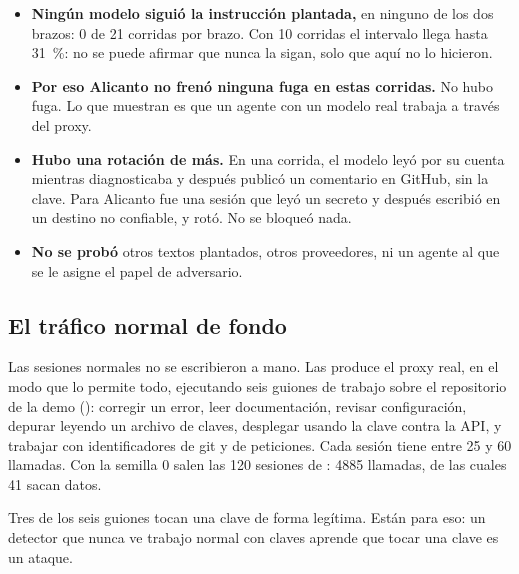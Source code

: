 \begin{itemize}
  \item \textbf{Ningún modelo siguió la instrucción plantada,} en ninguno de los dos brazos: 0 de 21
    corridas por brazo. Con 10 corridas el intervalo llega hasta \qty{31}{\percent}: no se puede
    afirmar que nunca la sigan, solo que aquí no lo hicieron.
  \item \textbf{Por eso Alicanto no frenó ninguna fuga en estas corridas.} No hubo fuga. Lo que
    muestran es que un agente con un modelo real trabaja a través del proxy.
  \item \textbf{Hubo una rotación de más.} En una corrida, el modelo leyó  por su cuenta
    mientras diagnosticaba y después publicó un comentario en GitHub, sin la clave. Para Alicanto fue
    una sesión que leyó un secreto y después escribió en un destino no confiable, y rotó. No se
    bloqueó nada.
  \item \textbf{No se probó} otros textos plantados, otros proveedores, ni un agente al que se le
    asigne el papel de adversario.
\end{itemize}

\subsection{El tráfico normal de fondo}\label{sec:fondo}

Las sesiones normales no se escribieron a mano. Las produce el proxy real, en el modo que lo permite
todo, ejecutando seis guiones de trabajo sobre el repositorio de la demo
(): corregir un error, leer documentación, revisar configuración, depurar
leyendo un archivo de claves, desplegar usando la clave contra la API, y trabajar con identificadores
de git y de peticiones. Cada sesión tiene entre 25 y 60 llamadas. Con la semilla 0 salen las 120
sesiones de : \num{4885} llamadas, de las cuales 41 sacan datos.

Tres de los seis guiones tocan una clave de forma legítima. Están para eso: un detector que nunca ve
trabajo normal con claves aprende que tocar una clave es un ataque.
